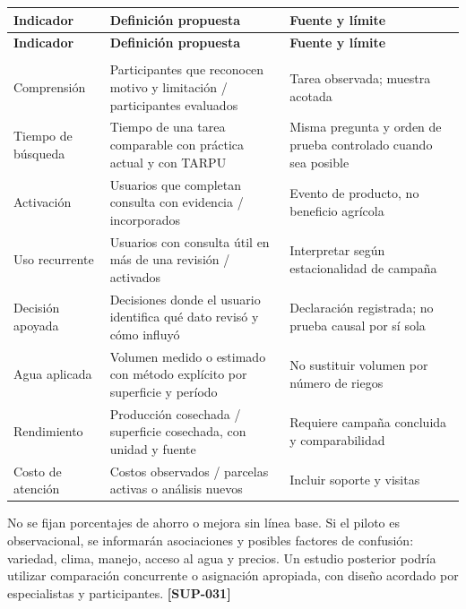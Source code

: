 \documentclass[10pt,a4paper]{article}
\begin{document}
\begingroup\small
\begin{longtable}{>{\raggedright\arraybackslash}p{3.647cm}>{\raggedright\arraybackslash}p{5.867cm}>{\raggedright\arraybackslash}p{6.343cm}}
\toprule
\textbf{Indicador} & \textbf{Definición propuesta} & \textbf{Fuente y límite} \\
\midrule\endfirsthead
\toprule
\textbf{Indicador} & \textbf{Definición propuesta} & \textbf{Fuente y límite} \\
\midrule\endhead
\midrule\multicolumn{3}{r}{\scriptsize Continúa en la página siguiente}\\\endfoot
\bottomrule\endlastfoot
Comprensión & Participantes que reconocen motivo y limitación /\allowbreak{} participantes evaluados & Tarea observada; muestra acotada \\[3pt]
Tiempo de búsqueda & Tiempo de una tarea comparable con práctica actual y con TARPU & Misma pregunta y orden de prueba controlado cuando sea posible \\[3pt]
Activación & Usuarios que completan consulta con evidencia /\allowbreak{} incorporados & Evento de producto, no beneficio agrícola \\[3pt]
Uso recurrente & Usuarios con consulta útil en más de una revisión /\allowbreak{} activados & Interpretar según estacionalidad de campaña \\[3pt]
Decisión apoyada & Decisiones donde el usuario identifica qué dato revisó y cómo influyó & Declaración registrada; no prueba causal por sí sola \\[3pt]
Agua aplicada & Volumen medido o estimado con método explícito por superficie y período & No sustituir volumen por número de riegos \\[3pt]
Rendimiento & Producción cosechada /\allowbreak{} superficie cosechada, con unidad y fuente & Requiere campaña concluida y comparabilidad \\[3pt]
Costo de atención & Costos observados /\allowbreak{} parcelas activas o análisis nuevos & Incluir soporte y visitas \\[3pt]
\end{longtable}
\endgroup

No se fijan porcentajes de ahorro o mejora sin línea base. Si el piloto es observacional, se informarán asociaciones y posibles factores de confusión: variedad, clima, manejo, acceso al agua y precios. Un estudio posterior podría utilizar comparación concurrente o asignación apropiada, con diseño acordado por especialistas y participantes. \textbf{[SUP-031]}
\end{document}
